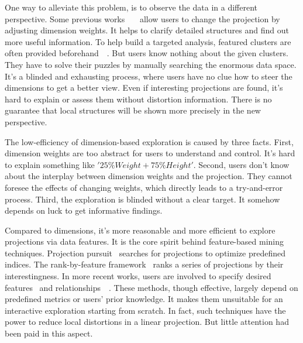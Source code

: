 {One way to alleviate this problem, is to observe the data in a different perspective. Some previous works~\cite{DBLP:journals/cgf/JeongZFRC09}~\cite{DBLP:journals/tvcg/NamM13}~\cite{DBLP:journals/tvcg/LehmannT13} allow users to change the projection by adjusting dimension weights. It helps to clarify detailed structures and find out more useful information. To help build a targeted analysis, featured clusters are often provided beforehand~\cite{DBLP:journals/tvcg/NamM13}~\cite{DBLP:journals/cgf/LiuWTBP15}. But users know nothing about the given clusters. They have to solve their puzzles by manually searching the enormous data space. It's a blinded and exhausting process, where users have no clue how to steer the dimensions to get a better view. Even if interesting projections are found, it's hard to explain or assess them without distortion information. There is no guarantee that local structures will be shown more precisely in the new perspective.

The low-efficiency of dimension-based exploration is caused by three facts. First, dimension weights are too abstract for users to understand and control. It's hard to explain something like $'25\% Weight + 75\% Height'$. Second, users don't know about the interplay between dimension weights and the projection. They cannot foresee the effects of changing weights, which directly leads to a try-and-error process. Third, the exploration is blinded without a clear target. It somehow depends on luck to get informative findings.

Compared to dimensions, it's more reasonable and more efficient to explore projections via data features. It is the core spirit behind feature-based mining techniques. Projection pursuit~\cite{DBLP:journals/tc/FriedmanT74} searches for projections to optimize predefined indices. The rank-by-feature framework~\cite{DBLP:journals/ivs/SeoS05} ranks a series of projections by their interestingness. In more recent works, users are involved to specify desired features~\cite{DBLP:journals/tvcg/JohanssonJ09} and relationships~\cite{DBLP:journals/tvcg/HuBMHNL13}~\cite{DBLP:journals/tvcg/Gleicher13}. These methods, though effective, largely depend on predefined metrics or users' prior knowledge. It makes them unsuitable for an interactive exploration starting from scratch. In fact, such techniques have the power to reduce local distortions in a linear projection. But little attention had been paid in this aspect.

}
